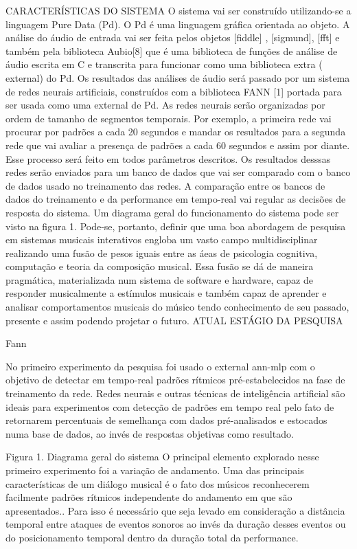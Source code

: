 \documentclass[draft]{ppgmus}
\begin{document}
CARACTERÍSTICAS DO SISTEMA
O sistema vai ser construído utilizando-se a linguagem Pure Data (Pd). O Pd é uma linguagem gráfica orientada ao objeto. 
A análise do áudio de entrada vai ser feita pelos objetos [fiddle\texttildelow] , [sigmund\texttildelow], [fft\texttildelow]
 e também pela biblioteca Aubio[8] que 
é uma biblioteca de funções de análise de áudio escrita em C e transcrita para funcionar como uma biblioteca extra (
external) do Pd. Os resultados das análises de áudio será passado por um sistema de redes neurais artificiais, 
construídos com a biblioteca FANN [1] portada para ser usada como uma external de Pd. As redes neurais serão organizadas 
por ordem de tamanho de segmentos temporais. Por exemplo, a primeira rede vai procurar por padrões a cada 20 segundos e 
mandar os resultados para a segunda rede que vai avaliar a presença de padrões a cada 60 segundos e assim por diante. 
Esse processo será feito em todos parâmetros descritos. Os resultados desssas redes serão enviados para um banco de dados
 que vai ser comparado com o banco de dados usado no treinamento das redes. A comparação entre os bancos de dados do 
treinamento e da performance em tempo-real vai regular as decisões de resposta do sistema. Um diagrama geral do 
funcionamento do sistema pode ser visto na figura 1.
  Pode-se, portanto, definir que uma boa abordagem de pesquisa em sistemas musicais interativos engloba um vasto 
campo multidisciplinar realizando uma fusão de pesos iguais entre as áeas de psicologia cognitiva, computação e teoria 
da composição musical. Essa fusão se dá de maneira pragmática, materializada num sistema de software e hardware, 
capaz de responder musicalmente a estímulos musicais e também capaz de aprender e analisar comportamentos musicais 
do músico tendo conhecimento de seu passado, presente e assim podendo projetar o futuro.
 ATUAL ESTÁGIO DA PESQUISA

 Fann 

No primeiro experimento da pesquisa  foi usado o external ann-mlp com o objetivo de detectar  em tempo-real padrões 
rítmicos pré-estabelecidos na fase de treinamento da rede.
   Redes neurais e outras técnicas de inteligência artificial são ideais para experimentos com detecção de padrões em 
tempo real  pelo fato de retornarem percentuais de semelhança com dados pré-analisados e estocados numa base de dados, 
ao invés de respostas objetivas como resultado.

Figura 1. Diagrama geral do sistema
 O principal elemento explorado  nesse primeiro experimento foi a variação de andamento. Uma das principais 
características de um diálogo musical é o fato dos músicos reconhecerem facilmente padrões rítmicos independente do 
andamento em que são apresentados.. Para isso é necessário que seja levado em consideração a distância temporal entre 
ataques de eventos sonoros ao invés da duração desses eventos ou do posicionamento temporal dentro da duração total da 
performance.
\end{document}
